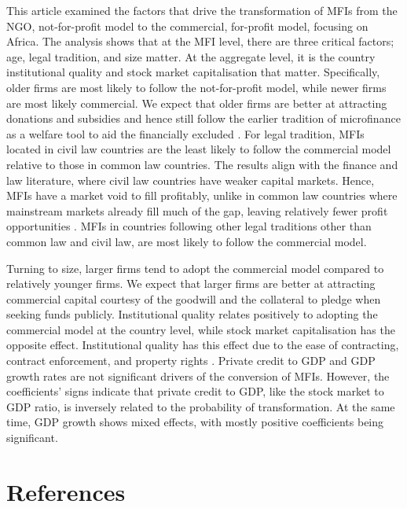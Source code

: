 \documentclass[a4paper,nobind]{templates/ociamthesis}
\begin{document}
This article examined the factors that drive the transformation of MFIs from the NGO, not-for-profit model to the commercial, for-profit model, focusing on Africa. The analysis shows that at the MFI level, there are three critical factors; age, legal tradition, and size matter. At the aggregate level, it is the country institutional quality and stock market capitalisation that matter. Specifically, older firms are most likely to follow the not-for-profit model, while newer firms are most likely commercial. We expect that older firms are better at attracting donations and subsidies and hence still follow the earlier tradition of microfinance as a welfare tool to aid the financially excluded \autocite{d2017ngos}. For legal tradition, MFIs located in civil law countries are the least likely to follow the commercial model relative to those in common law countries. The results align with the finance and law literature, where civil law countries have weaker capital markets. Hence, MFIs have a market void to fill profitably, unlike in common law countries where mainstream markets already fill much of the gap, leaving relatively fewer profit opportunities \autocite{la2013law,schnyder2018twenty}. MFIs in countries following other legal traditions other than common law and civil law, are most likely to follow the commercial model.

Turning to size, larger firms tend to adopt the commercial model compared to relatively younger firms. We expect that larger firms are better at attracting commercial capital courtesy of the goodwill and the collateral to pledge when seeking funds publicly. Institutional quality relates positively to adopting the commercial model at the country level, while stock market capitalisation has the opposite effect. Institutional quality has this effect due to the ease of contracting, contract enforcement, and property rights \autocite{claessens2003financial}. Private credit to GDP and GDP growth rates are not significant drivers of the conversion of MFIs. However, the coefficients' signs indicate that private credit to GDP, like the stock market to GDP ratio, is inversely related to the probability of transformation. At the same time, GDP growth shows mixed effects, with mostly positive coefficients being significant.

\hypertarget{references}{%
\chapter{\texorpdfstring{\textbf{References}}{References}}\label{references}}
\end{document}
